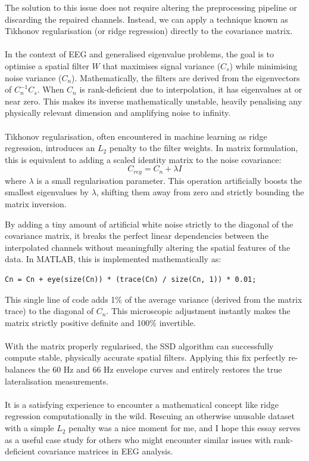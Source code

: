 \documentclass{article}
\begin{document}
The solution to this issue does not require altering the preprocessing pipeline or discarding the repaired channels. Instead, we can apply a technique known as Tikhonov regularisation (or ridge regression) directly to the covariance matrix. 
\\\\
In the context of EEG and generalised eigenvalue problems, the goal is to optimise a spatial filter $W$ that maximises signal variance ($C_s$) while minimising noise variance ($C_n$). Mathematically, the filters are derived from the eigenvectors of $C_n^{-1}C_s$. When $C_n$ is rank-deficient due to interpolation, it has eigenvalues at or near zero. This makes its inverse mathematically unstable, heavily penalising any physically relevant dimension and amplifying noise to infinity.
\\\\
Tikhonov regularisation, often encountered in machine learning as ridge regression, introduces an $L_2$ penalty to the filter weights. In matrix formulation, this is equivalent to adding a scaled identity matrix to the noise covariance:
\begin{equation}
    C_{reg} = C_n + \lambda I
\end{equation}
where $\lambda$ is a small regularisation parameter. This operation artificially boosts the smallest eigenvalues by $\lambda$, shifting them away from zero and strictly bounding the matrix inversion.

By adding a tiny amount of artificial white noise strictly to the diagonal of the covariance matrix, it breaks the perfect linear dependencies between the interpolated channels without meaningfully altering the spatial features of the data. In MATLAB, this is implemented mathematically as:

\begin{verbatim}
Cn = Cn + eye(size(Cn)) * (trace(Cn) / size(Cn, 1)) * 0.01;
\end{verbatim}

This single line of code adds 1\% of the average variance (derived from the matrix trace) to the diagonal of $C_n$. This microscopic adjustment instantly makes the matrix strictly positive definite and 100\% invertible. 
\\\\
With the matrix properly regularised, the SSD algorithm can successfully compute stable, physically accurate spatial filters. Applying this fix perfectly re-balances the 60 Hz and 66 Hz envelope curves and entirely restores the true lateralisation measurements.
\\\\
It is a satisfying experience to encounter a mathematical concept like ridge regression computationally in the wild. Rescuing an otherwise unusable dataset with a simple $L_2$ penalty was a nice moment for me, and I hope this essay serves as a useful case study for others who might encounter similar issues with rank-deficient covariance matrices in EEG analysis.
\end{document}
